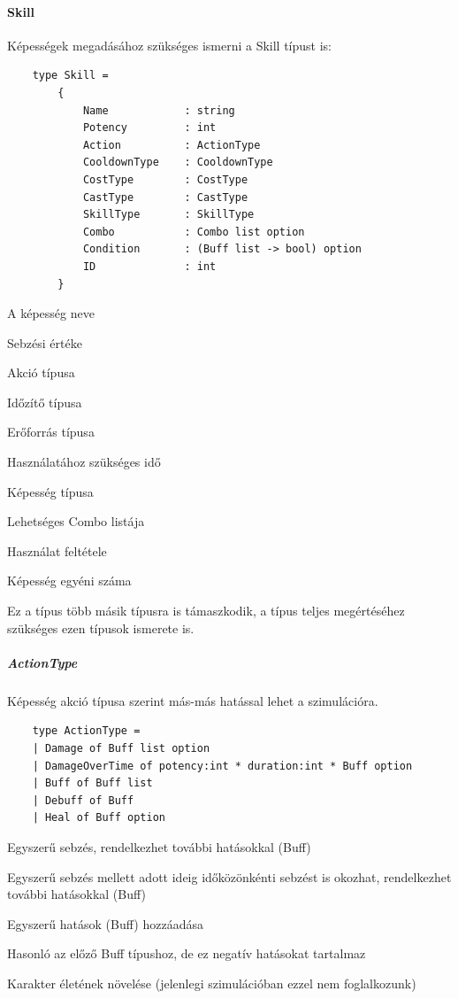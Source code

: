 \documentclass[12pt]{article}
\begin{document}
	\paragraph{Skill} Képességek megadásához szükséges ismerni a Skill típust is:
	
	\begin{lstlisting}
	type Skill =
		{
			Name            : string
			Potency         : int
			Action          : ActionType
			CooldownType    : CooldownType
			CostType        : CostType
			CastType        : CastType
			SkillType       : SkillType
			Combo           : Combo list option
			Condition       : (Buff list -> bool) option
			ID              : int
		}
	\end{lstlisting}
	
	\begin{description}[align=left,labelwidth=2.5cm]
		\item [Name] A képesség neve
		\item [Potency] Sebzési értéke
		\item [Action] Akció típusa
		\item [CooldownType] Időzítő típusa
		\item [CostType] Erőforrás típusa
		\item [CastType] Használatához szükséges idő
		\item [SkillType] Képesség típusa
		\item [Combo] Lehetséges Combo listája
		\item [Condition] Használat feltétele
		\item [ID] Képesség egyéni száma
	\end{description}
	
	Ez a típus több másik típusra is támaszkodik, a típus teljes megértéséhez szükséges ezen típusok ismerete is.
	
	\subparagraph{ActionType} 
	
	Képesség akció típusa szerint más-más hatással lehet a szimulációra.
	
	\begin{lstlisting}
	type ActionType = 
	| Damage of Buff list option
	| DamageOverTime of potency:int * duration:int * Buff option
	| Buff of Buff list
	| Debuff of Buff
	| Heal of Buff option
	\end{lstlisting}
	
	\begin{description}[align=left,labelwidth=2.5cm]
		\item [Damage] Egyszerű sebzés, rendelkezhet további hatásokkal (Buff)
		\item [DamageOverTime] Egyszerű sebzés mellett adott ideig időközönkénti sebzést is okozhat, rendelkezhet további hatásokkal (Buff)
		\item [Buff] Egyszerű hatások (Buff) hozzáadása
		\item [Debuff] Hasonló az előző Buff típushoz, de ez negatív hatásokat tartalmaz
		\item [Heal] Karakter életének növelése (jelenlegi szimulációban ezzel nem foglalkozunk)
	\end{description}
	
\end{document}
